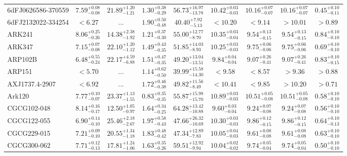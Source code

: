 \documentclass[onecolumn]{mn2e}
\begin{document}
{\begin{center}
\begin{longtable}{lcccccccc}
6dFJ0626586-370559 & $7.59_{-0.08}^{+0.08}$ & $21.89_{-1.21}^{+1.20}$ & $1.30_{-0.29}^{+0.38}$ &$56.73_{-13.78}^{+16.97}$ & $10.42_{-0.03}^{+0.03}$ & $10.16_{-0.07}^{+0.07}$ & $10.16_{-0.07}^{+0.07}$ & $0.45_{-0.11}^{+0.10}$ \\
6dFJ2132022-334254 & $<6.27$ & ... & $1.90_{-0.48}^{+0.50}$ &$40.40_{-5.13}^{+7.92}$ & $<10.20$ & $<9.14$ & $>10.01$ & $>0.89$ \\
ARK241 & $8.06_{-0.26}^{+0.25}$ & $14.38_{-1.92}^{+2.38}$ & $1.21_{-0.30}^{+0.37}$ &$55.00_{-8.70}^{+12.77}$ & $10.35_{-0.04}^{+0.03}$ & $9.54_{-0.15}^{+0.13}$ & $9.54_{-0.15}^{+0.13}$ & $0.84_{-0.10}^{+0.10}$ \\
ARK347 & $7.15_{-0.08}^{+0.07}$ & $22.10_{-1.12}^{+1.20}$ & $1.49_{-0.35}^{+0.43}$ &$51.85_{-8.93}^{+14.03}$ & $10.25_{-0.03}^{+0.03}$ & $9.75_{-0.06}^{+0.06}$ & $9.75_{-0.06}^{+0.06}$ & $0.69_{-0.10}^{+0.10}$ \\
ARP102B & $6.48_{-0.24}^{+0.55}$ & $22.17_{-6.88}^{+4.59}$ & $1.51_{-0.35}^{+0.47}$ &$49.20_{-13.51}^{+13.04}$ & $9.84_{-0.04}^{+0.04}$ & $9.07_{-0.41}^{+0.26}$ & $9.07_{-0.41}^{+0.26}$ & $0.83_{-0.15}^{+0.10}$ \\
ARP151 & $<5.70$ & ... & $1.14_{-0.50}^{+0.62}$ &$39.99_{-14.30}^{+15.58}$ & $<9.58$ & $<8.57$ & $>9.36$ & $>0.88$ \\
AXJ1737.4-2907 & $<6.92$ & ... & $1.72_{-0.38}^{+0.46}$ &$49.82_{-8.49}^{+11.56}$ & $<10.41$ & $<9.85$ & $>10.20$ & $>0.71$ \\
Ark120 & $7.77_{-0.07}^{+0.10}$ & $23.37_{-1.55}^{+1.13}$ & $0.83_{-0.35}^{+0.35}$ &$55.87_{-15.70}^{+15.98}$ & $10.89_{-0.03}^{+0.03}$ & $10.51_{-0.08}^{+0.05}$ & $10.51_{-0.08}^{+0.05}$ & $0.58_{-0.10}^{+0.10}$ \\
CGCG102-048 & $8.14_{-0.17}^{+0.16}$ & $12.50_{-0.97}^{+1.05}$ & $1.64_{-0.25}^{+0.34}$ &$64.28_{-10.88}^{+13.42}$ & $9.60_{-0.04}^{+0.03}$ & $9.24_{-0.08}^{+0.07}$ & $9.24_{-0.08}^{+0.07}$ & $0.56_{-0.10}^{+0.10}$ \\
CGCG122-055 & $6.90_{-0.10}^{+0.14}$ & $25.46_{-2.67}^{+2.18}$ & $1.97_{-0.43}^{+0.58}$ &$47.66_{-10.69}^{+26.32}$ & $10.30_{-0.03}^{+0.03}$ & $9.86_{-0.15}^{+0.12}$ & $9.86_{-0.15}^{+0.12}$ & $0.64_{-0.13}^{+0.10}$ \\
CGCG229-015 & $7.21_{-0.10}^{+0.09}$ & $20.55_{-1.18}^{+1.34}$ & $1.83_{-0.42}^{+0.48}$ &$47.34_{-7.83}^{+12.89}$ & $10.05_{-0.03}^{+0.04}$ & $9.61_{-0.08}^{+0.08}$ & $9.61_{-0.08}^{+0.08}$ & $0.63_{-0.10}^{+0.10}$ \\
CGCG300-062 & $7.71_{-0.13}^{+0.12}$ & $17.81_{-1.06}^{+1.24}$ & $1.63_{-0.26}^{+0.35}$ &$59.51_{-9.94}^{+12.92}$ & $10.04_{-0.02}^{+0.02}$ & $9.74_{-0.04}^{+0.05}$ & $9.74_{-0.04}^{+0.05}$ & $0.50_{-0.10}^{+0.10}$ \\

\end{longtable}
\end{center}}
\end{document}
